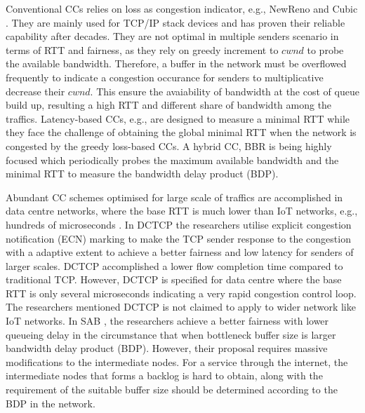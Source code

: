 \documentclass[journal]{IEEEtran}
\begin{document}
Conventional CCs relies on loss as congestion indicator, e.g., NewReno \cite{floyd2004newreno} and Cubic \cite{ha2008cubic}. They are mainly used for TCP/IP stack devices and has proven their reliable capability after decades. They are not optimal in multiple senders scenario in terms of RTT and fairness, as they rely on greedy increment to $cwnd$ to probe the available bandwidth. Therefore, a buffer in the network must be overflowed frequently to indicate a congestion occurance for senders to multiplicative decrease their $cwnd$. This ensure the avaiability of bandwidth at the cost of queue build up, resulting a high RTT and different share of bandwidth among the traffics. Latency-based CCs, e.g.,  \cite{brakmo1994tcp} are designed to measure a minimal RTT while they face the challenge of obtaining the global minimal RTT when the network is congested by the greedy loss-based CCs. A hybrid CC, BBR \cite{cardwell2017bbr} is being highly focused which periodically probes the maximum available bandwidth and the minimal RTT to measure the bandwidth delay product (BDP).

Abundant CC schemes optimised for large scale of traffics are accomplished in data centre networks, where the base RTT is much lower than IoT networks, e.g., hundreds of microseconds \cite{alizadeh2010data}. In DCTCP the researchers utilise explicit congestion notification (ECN) marking to make the TCP sender response to the congestion with a adaptive extent to achieve a better fairness and low latency for senders of larger scales. DCTCP accomplished a lower flow completion time compared to traditional TCP. However, DCTCP is specified for data centre where the base RTT is only several microseconds indicating a very rapid congestion control loop. The researchers mentioned DCTCP is not claimed to apply to wider network like IoT networks. In SAB \cite{zhang2013sharing}, the researchers achieve a better fairness with lower queueing delay in the circumstance that when bottleneck buffer size is larger bandwidth delay product (BDP). However, their proposal requires massive modifications to the intermediate nodes. For a service through the internet, the intermediate nodes that forms a backlog is hard to obtain, along with the requirement of the suitable buffer size should be determined according to the BDP in the network.
\end{document}
